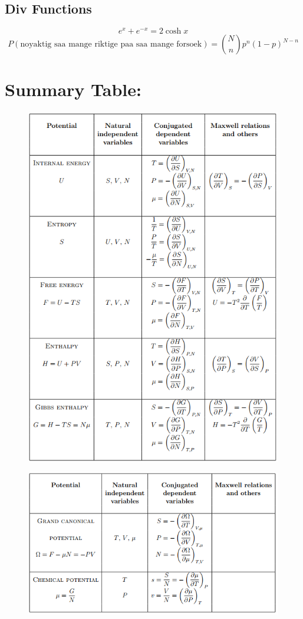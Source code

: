 \documentclass[a4paper,norsk, 10pt]{article}
\begin{document}
\subsection{Div Functions}
\begin{equation}
e^x + e^{-x} = 2\cosh x
\end{equation}
\begin{equation}
P(\text{noyaktig saa mange riktige paa saa mange forsoek}) = \binom{N}{n}p^n(1-p)^{N-n}
\end{equation}
\section{Summary Table:}
\begin{figure}[H]
\centering
\includegraphics[scale=1]{skjema1}
\end{figure}
\begin{figure}[H]
\centering
\includegraphics[scale=1]{skjema2}
\end{figure}
\end{document}
